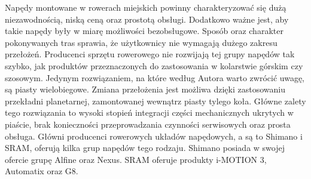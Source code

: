 Napędy montowane w rowerach miejskich powinny charakteryzować się dużą niezawodnością, niską ceną oraz prostotą obsługi. Dodatkowo ważne jest, aby takie napędy były w miarę możliwości bezobsługowe. Sposób oraz charakter pokonywanych tras sprawia, że użytkownicy nie wymagają dużego zakresu przełożeń. Producenci sprzętu rowerowego nie rozwijają tej grupy napędów tak szybko, jak produktów przeznaczonych do zastosowania w kolarstwie górskim czy szosowym. Jedynym rozwiązaniem, na które według Autora warto zwrócić uwagę, są piasty wielobiegowe. Zmiana przełożenia jest możliwa dzięki zastosowaniu przekładni planetarnej, zamontowanej wewnątrz piasty tylego koła. Główne zalety tego rozwiązania to wysoki stopień integracji części mechanicznych ukrytych w piaście, brak konieczności przeprowadzania czynności serwisowych oraz prosta obsługa. Główni producenci rowerowych układów napędowych, a są to Shimano i SRAM, oferują kilka grup napędów tego rodzaju. Shimano posiada w swojej ofercie grupę Alfine oraz Nexus. SRAM oferuje produkty i-MOTION 3, Automatix oraz G8. 

   

